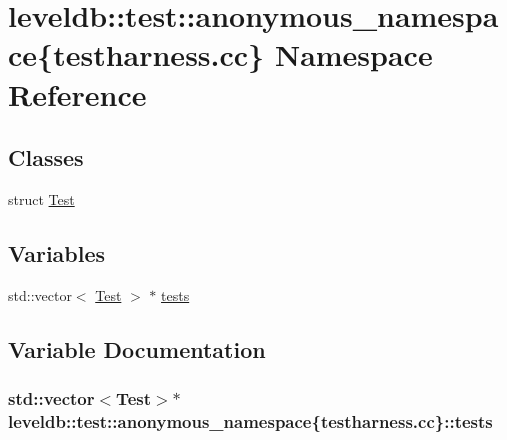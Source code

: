 \hypertarget{namespaceleveldb_1_1test_1_1anonymous__namespace_02testharness_8cc_03}{}\section{leveldb\+:\+:test\+:\+:anonymous\+\_\+namespace\{testharness.\+cc\} Namespace Reference}
\label{namespaceleveldb_1_1test_1_1anonymous__namespace_02testharness_8cc_03}
\subsection*{Classes}
\begin{DoxyCompactItemize}
\item 
struct \hyperlink{structleveldb_1_1test_1_1anonymous__namespace_02testharness_8cc_03_1_1_test}{Test}
\end{DoxyCompactItemize}
\subsection*{Variables}
\begin{DoxyCompactItemize}
\item 
std\+::vector$<$ \hyperlink{structleveldb_1_1test_1_1anonymous__namespace_02testharness_8cc_03_1_1_test}{Test} $>$ $\ast$ \hyperlink{namespaceleveldb_1_1test_1_1anonymous__namespace_02testharness_8cc_03_ae20aa3df2ca7bec2792ae5f20d511829}{tests}
\end{DoxyCompactItemize}


\subsection{Variable Documentation}
\hypertarget{namespaceleveldb_1_1test_1_1anonymous__namespace_02testharness_8cc_03_ae20aa3df2ca7bec2792ae5f20d511829}{}
\subsubsection[{tests}]{\setlength{\rightskip}{0pt plus 5cm}std\+::vector$<${\bf Test}$>$$\ast$ leveldb\+::test\+::anonymous\+\_\+namespace\{testharness.\+cc\}\+::tests}\label{namespaceleveldb_1_1test_1_1anonymous__namespace_02testharness_8cc_03_ae20aa3df2ca7bec2792ae5f20d511829}
